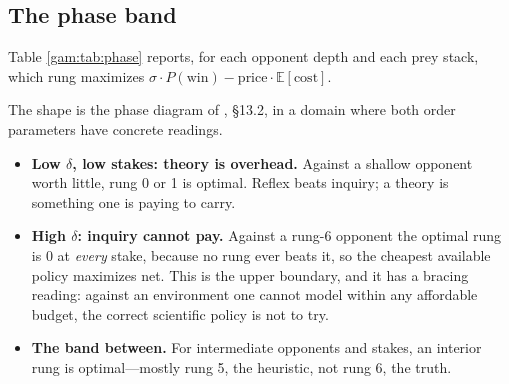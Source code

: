 \subsection{The phase band}\label{gam:S8.3}

Table \ref{gam:tab:phase} reports, for each opponent depth and each prey stack, which
rung maximizes $\sigma\cdot P(\text{win}) - \text{price}\cdot \mathbb{E}[\text{cost}]$.

\begin{table}[h]
\centering
{}
\caption{Optimal rung, at price $0.05$ per metered unit, as a function of the
prey's stack $\sigma$ (rows) and the prey's own rung (columns). The optimal rung
is $0$ in both extremes and interior in between.}
\label{gam:tab:phase}
\end{table}

The shape is the phase diagram of \chSci, \S13.2, in a domain where
both order parameters have concrete readings.

\begin{itemize}
\item \textbf{Low $\delta$, low stakes: theory is overhead.} Against a shallow
opponent worth little, rung 0 or 1 is optimal. Reflex beats inquiry; a theory is
something one is paying to carry.
\item \textbf{High $\delta$: inquiry cannot pay.} Against a rung-6 opponent the
optimal rung is $0$ at \emph{every} stake, because no rung ever beats it, so the
cheapest available policy maximizes net. This is the upper boundary, and it has
a bracing reading: against an environment one cannot model within any affordable
budget, the correct scientific policy is not to try.
\item \textbf{The band between.} For intermediate opponents and stakes, an
interior rung is optimal---mostly rung 5, the heuristic, not rung 6, the truth.
\end{itemize}

